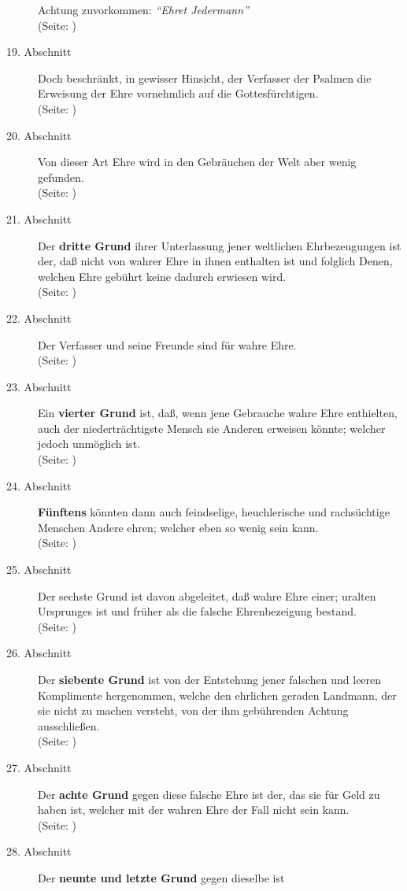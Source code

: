 \begin{description}
Achtung zuvorkommen: \textit{"`Ehret Jedermann"'}
\\ (Seite: \pageref{kap9_ab18})
\item[19. Abschnitt] Doch beschränkt, in gewisser Hinsicht, der Verfasser der
Psalmen die Erweisung der Ehre vornehmlich auf die Gottesfürchtigen.
\\ (Seite: \pageref{kap9_ab19})
\item[20. Abschnitt] Von dieser Art Ehre wird in den Gebräuchen der Welt aber
wenig gefunden.
\\ (Seite: \pageref{kap9_ab20})
\item[21. Abschnitt] Der \textbf{dritte Grund} ihrer Unterlassung jener
weltlichen
Ehrbezeugungen ist der, daß nicht von wahrer Ehre in ihnen enthalten ist und
folglich Denen, welchen Ehre gebührt keine dadurch erwiesen wird.
\\ (Seite: \pageref{kap9_ab21})
\item[22. Abschnitt] Der Verfasser und seine Freunde sind für wahre Ehre.
\\ (Seite: \pageref{kap9_ab22})
\item[23. Abschnitt] Ein \textbf{vierter Grund} ist, daß, wenn jene Gebrauche
wahre Ehre
enthielten, auch der niederträchtigste Mensch sie Anderen erweisen könnte;
welcher jedoch unmöglich ist.
\\ (Seite: \pageref{kap9_ab23})
\item[24. Abschnitt] \textbf{Fünftens} könnten dann auch feindselige,
heuchlerische und
rachsüchtige Menschen Andere ehren; welcher eben so wenig sein kann.
\\ (Seite: \pageref{kap9_ab24})
\item[25. Abschnitt] Der sechste Grund ist davon abgeleitet, daß wahre Ehre
einer; uralten Ursprunges ist und früher als die falsche Ehrenbezeigung bestand.
\\ (Seite: \pageref{kap9_ab25})
\item[26. Abschnitt] Der \textbf{siebente Grund} ist von der Entstehung jener
falschen
und leeren Komplimente hergenommen, welche den ehrlichen geraden Landmann, der
sie nicht zu machen versteht, von der ihm gebührenden Achtung ausschließen.
\\ (Seite: \pageref{kap9_ab26})
\item[27. Abschnitt] Der \textbf{achte Grund} gegen diese falsche Ehre ist der,
das sie
für Geld zu haben ist, welcher mit der wahren Ehre der Fall nicht sein kann.
\\ (Seite: \pageref{kap9_ab27})
\item[28. Abschnitt] Der \textbf{neunte und letzte Grund} gegen dieselbe ist

\end{description}
